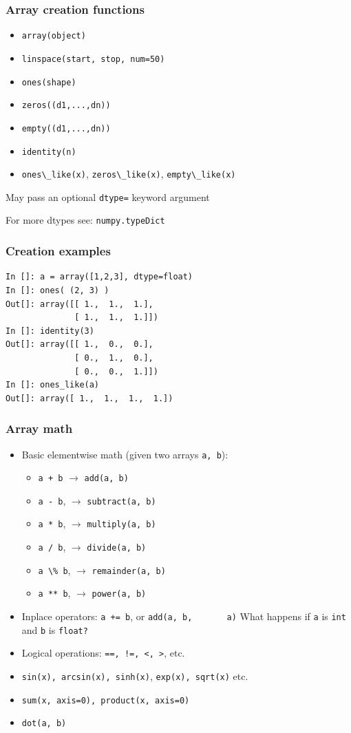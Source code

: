 \documentclass[14pt,compress]{beamer}
\newcommand{\typ}[1]{\lstinline{#1}}
\begin{document}
\begin{frame}[fragile]
  \frametitle{Array creation functions}
  \begin{itemize}
  \item \typ{array(object)}
  \item \typ{linspace(start, stop, num=50)}
  \item \typ{ones(shape)}
  \item \typ{zeros((d1,...,dn))}
  \item \typ{empty((d1,...,dn))}
  \item \typ{identity(n)}
  \item \typ{ones\_like(x)}, \typ{zeros\_like(x)}, \typ{empty\_like(x)}
  \end{itemize}
  May pass an optional \typ{dtype=} keyword argument

  For more dtypes see: \typ{numpy.typeDict}
\end{frame}

\begin{frame}[fragile]
  \frametitle{Creation examples}
  \vspace*{-0.25in}
\begin{lstlisting}
In []: a = array([1,2,3], dtype=float)
In []: ones( (2, 3) )
Out[]: array([[ 1.,  1.,  1.],
              [ 1.,  1.,  1.]])
In []: identity(3)
Out[]: array([[ 1.,  0.,  0.],
              [ 0.,  1.,  0.],
              [ 0.,  0.,  1.]])
In []: ones_like(a)
Out[]: array([ 1.,  1.,  1.,  1.])
\end{lstlisting}
\end{frame}

\begin{frame}[fragile]
  \frametitle{Array math}
  \begin{itemize}
  \item Basic \alert{elementwise} math (given two arrays \typ{a, b}):
    \begin{itemize}
        \item \typ{a + b} $\rightarrow$ \typ{add(a, b)} 
        \item \typ{a - b}, $\rightarrow$ \typ{subtract(a, b)} 
        \item \typ{a * b}, $\rightarrow$ \typ{multiply(a, b)} 
        \item \typ{a / b}, $\rightarrow$ \typ{divide(a, b)} 
        \item \typ{a \% b}, $\rightarrow$ \typ{remainder(a, b)} 
        \item \typ{a ** b}, $\rightarrow$ \typ{power(a, b)}
    \end{itemize}
  \item Inplace operators: \typ{a += b}, or \typ{add(a, b,
      a)}
    \alert{What happens if \typ{a} is \typ{int} and \typ{b} is \typ{float?}}
  \item Logical operations: \typ{==, !=, <, >}, etc.
  \item \typ{sin(x), arcsin(x), sinh(x)},
      \typ{exp(x), sqrt(x)} etc.
  \item \typ{sum(x, axis=0), product(x, axis=0)}
  \item \typ{dot(a, b)}
  \end{itemize}
\end{frame}
\end{document}
